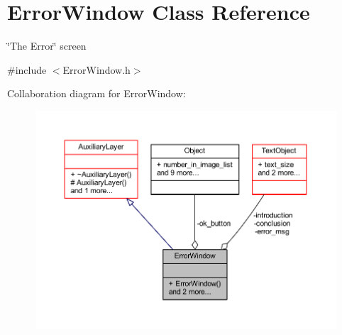 \hypertarget{class_error_window}{}\section{Error\+Window Class Reference}
\label{class_error_window}


\char`\"{}\+The Error\char`\"{} screen  




{\ttfamily \#include $<$Error\+Window.\+h$>$}



Collaboration diagram for Error\+Window\+:\nopagebreak
\begin{figure}[H]
\begin{center}
\leavevmode
\includegraphics[width=350pt]{class_error_window__coll__graph}
\end{center}
\end{figure}
